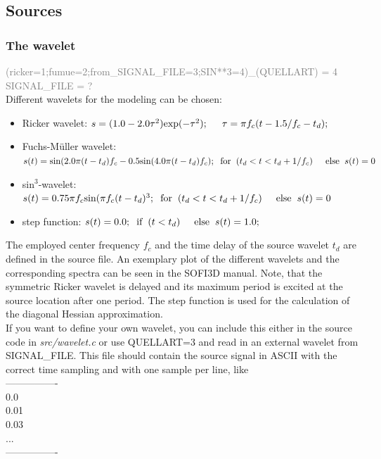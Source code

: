 \subsection{Sources}
\subsubsection*{The wavelet}
\textcolor {Gray}{(ricker=1;fumue=2;from\_SIGNAL\_FILE=3;SIN**3=4)\_(QUELLART) = 4\\
SIGNAL\_FILE = ?} \vspace{0.1cm}\\
Different wavelets for the modeling can be chosen:
\begin{itemize}
 \item  Ricker wavelet: $s=(1.0-2.0\tau ^2)\text{exp}(-\tau ^2); \hspace{0.5cm}	\tau=\pi f_c(t-1.5/f_c-t_d);$	
\item Fuchs-M\"uller wavelet: $s(t)=\text{sin}(2.0\pi (t-t_d)f_c-0.5 \text{sin}(4.0\pi (t-t_d)f_c); \hspace{0.2cm}\text{for}\hspace{0.2cm}(t_d<t<t_d+1/f_c) \hspace{0.5cm}\text{else}\hspace{0.2cm} s(t)=0$
\item sin$^3$-wavelet: $s(t)=0.75\pi f_c\text{sin}(\pi f_c(t-t_d)^3;\hspace{0.2cm}\text{for}\hspace{0.2cm}(t_d<t<t_d+1/f_c) \hspace{0.5cm}\text{else}\hspace{0.2cm} s(t)=0$
\item step function: $s(t)=0.0; \hspace{0.2cm}\text{if}\hspace{0.2cm}(t<t_d) \hspace{0.5cm}\text{else} \hspace{0.2cm} s(t)=1.0; $
\end{itemize}
The employed center frequency $f_c$ and the time delay of the source wavelet $t_d$ are defined in the source file. An exemplary plot of the different wavelets and the corresponding spectra can be seen in the SOFI3D manual. Note, that the symmetric Ricker wavelet is delayed and its maximum period is excited at the source location after one period. The step function is used for the calculation of the diagonal Hessian approximation. \\
If you want to define your own wavelet, you can include this either in the source code in \textit{src/wavelet.c} or use QUELLART=3 and read in an external wavelet from SIGNAL\_FILE. This file should contain the source signal in ASCII with the correct time sampling and with one sample per line, like \\
----------------\\
0.0\\
0.01\\
0.03\\
...\\
----------------

